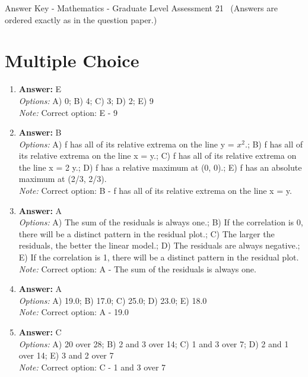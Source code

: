 \documentclass[12pt]{article}
\begin{document}
\begin{center}
Answer Key - Mathematics - Graduate Level Assessment 21 \
\small (Answers are ordered exactly as in the question paper.)
\end{center}

\section*{Multiple Choice}
\begin{enumerate}[label=\arabic*.]
\item \textbf{Answer:} E
\\ \textit{Options:} A) 0; B) 4; C) 3; D) 2; E) 9
\\ \textit{Note:} Correct option: E - 9
\item \textbf{Answer:} B
\\ \textit{Options:} A) f has all of its relative extrema on the line y = $x^2$.; B) f has all of its relative extrema on the line x = y.; C) f has all of its relative extrema on the line x = 2 y.; D) f has a relative maximum at (0, 0).; E) f has an absolute maximum at (2/3, 2/3).
\\ \textit{Note:} Correct option: B - f has all of its relative extrema on the line x = y.
\item \textbf{Answer:} A
\\ \textit{Options:} A) The sum of the residuals is always one.; B) If the correlation is 0, there will be a distinct pattern in the residual plot.; C) The larger the residuals, the better the linear model.; D) The residuals are always negative.; E) If the correlation is 1, there will be a distinct pattern in the residual plot.
\\ \textit{Note:} Correct option: A - The sum of the residuals is always one.
\item \textbf{Answer:} A
\\ \textit{Options:} A) 19.0; B) 17.0; C) 25.0; D) 23.0; E) 18.0
\\ \textit{Note:} Correct option: A - 19.0
\item \textbf{Answer:} C
\\ \textit{Options:} A) 20 over 28; B) 2 and 3 over 14; C) 1 and 3 over 7; D) 2 and 1 over 14; E) 3 and 2 over 7
\\ \textit{Note:} Correct option: C - 1 and 3 over 7
\end{enumerate}
\end{document}

